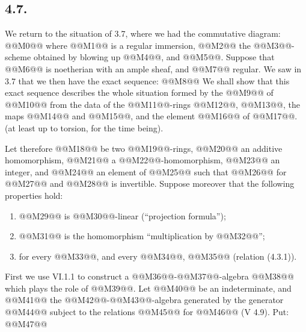 \subsection*{4.7.}

We return to the situation of 3.7, where we had the commutative diagram:
@@M0@@
where @@M1@@ is a regular immersion, @@M2@@ the @@M3@@-scheme obtained by blowing up @@M4@@, and @@M5@@. Suppose that @@M6@@ is noetherian with an ample sheaf, and @@M7@@ regular. We saw in 3.7 that we then have the exact sequence:
@@M8@@
We shall show that this exact sequence describes the whole situation formed by the @@M9@@ of @@M10@@ from the data of the @@M11@@-rings @@M12@@, @@M13@@, the maps @@M14@@ and @@M15@@, and the element @@M16@@ of @@M17@@. (at least up to torsion, for the time being).

Let therefore @@M18@@ be two @@M19@@-rings, @@M20@@ an additive homomorphism, @@M21@@ a @@M22@@-homomorphism, @@M23@@ an integer, and @@M24@@ an element of @@M25@@ such that @@M26@@ for @@M27@@ and @@M28@@ is invertible. Suppose moreover that the following properties hold:
\begin{enumerate}[label=\roman*)]
\item @@M29@@ is @@M30@@-linear (``projection formula'');
\item @@M31@@ is the homomorphism ``multiplication by @@M32@@'';
\item for every @@M33@@, and every @@M34@@, @@M35@@ (relation (4.3.1)).
\end{enumerate}

First we use VI.1.1 to construct a @@M36@@-@@M37@@-algebra @@M38@@ which plays the role of @@M39@@. Let @@M40@@ be an indeterminate, and @@M41@@ the @@M42@@-@@M43@@-algebra generated by the generator @@M44@@ subject to the relations @@M45@@ for @@M46@@ (V 4.9). Put:
@@M47@@
